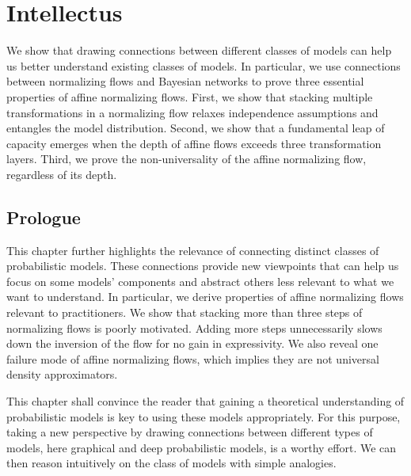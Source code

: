 \chapter{Intellectus}\label{ch:04}

\begin{chapter_outline}

  We show that drawing connections between different classes of models can help us better understand existing classes of models.
  In particular, we use connections between normalizing flows and Bayesian networks to prove three essential properties of affine normalizing flows.
  First, we show that stacking multiple transformations in a normalizing flow relaxes independence assumptions and entangles the model distribution.
  Second, we show that a fundamental leap of capacity emerges when the depth of affine flows exceeds three transformation layers.
  Third, we prove the non-universality of the affine normalizing flow, regardless of its depth.
\end{chapter_outline}

\section{Prologue}
This chapter further highlights the relevance of connecting distinct classes of probabilistic models. These connections provide new viewpoints that can help us focus on some models' components and abstract others less relevant to what we want to understand. In particular, we derive properties of affine normalizing flows relevant to practitioners. We show that stacking more than three steps of normalizing flows is poorly motivated. Adding more steps unnecessarily slows down the inversion of the flow for no gain in expressivity. We also reveal one failure mode of affine normalizing flows, which implies they are not universal density approximators.

This chapter shall convince the reader that gaining a theoretical understanding of probabilistic models is key to using these models appropriately. For this purpose, taking a new perspective by drawing connections between different types of models, here graphical and deep probabilistic models, is a worthy effort. We can then reason intuitively on the class of models with simple analogies.

